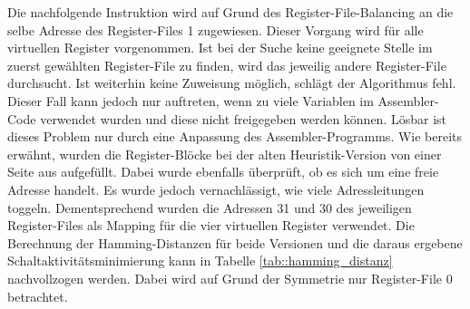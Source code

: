 Die nachfolgende Instruktion wird auf Grund des Register-File-Balancing an die selbe Adresse des Register-Files 1 zugewiesen. Dieser Vorgang wird für alle virtuellen Register vorgenommen. Ist bei der Suche keine geeignete Stelle im zuerst gewählten Register-File zu finden, wird das jeweilig andere Register-File durchsucht. Ist weiterhin keine Zuweisung möglich, schlägt der Algorithmus fehl. Dieser Fall kann jedoch nur auftreten, wenn zu viele Variablen im Assembler-Code verwendet wurden und diese nicht freigegeben werden können. Lösbar ist dieses Problem nur durch eine Anpassung des Assembler-Programms.
Wie bereits erwähnt, wurden die Register-Blöcke bei der alten Heuristik-Version von einer Seite aus aufgefüllt. Dabei wurde ebenfalls überprüft, ob es sich um eine freie Adresse handelt. Es wurde jedoch vernachlässigt, wie viele Adressleitungen toggeln. Dementsprechend wurden die Adressen 31 und 30 des jeweiligen Register-Files als Mapping für die vier virtuellen Register verwendet.
Die Berechnung der Hamming-Distanzen für beide Versionen und die daraus ergebene Schaltaktivitätsminimierung kann in Tabelle \ref{tab::hamming_distanz} nachvollzogen werden. Dabei wird auf Grund der Symmetrie nur Register-File 0 betrachtet.

